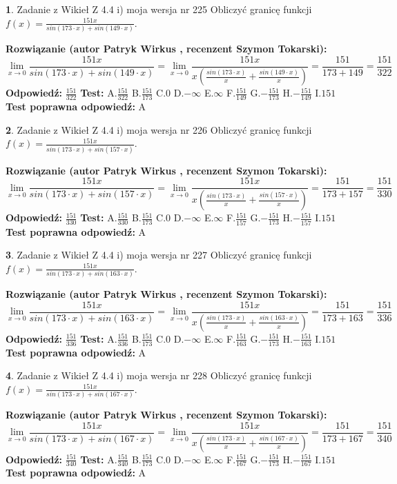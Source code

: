 \documentclass[12pt, a4paper]{article}
\theoremstyle{definition} %
\newtheorem{zad}{}
\newcommand{\zadStart}[1]{\begin{zad}#1\newline}
\newcommand{\zadStop}{\end{zad}}
\newcommand{\rozwStart}[2]{\noindent \textbf{Rozwiązanie (autor #1 , recenzent #2): }\newline}
\newcommand{\rozwStop}{\newline}
\newcommand{\odpStart}{\noindent \textbf{Odpowiedź:}\newline}
\newcommand{\odpStop}{\newline}
\newcommand{\testStart}{\noindent \textbf{Test:}\newline}
\newcommand{\testStop}{\newline}
\newcommand{\kluczStart}{\noindent \textbf{Test poprawna odpowiedź:}\newline}
\newcommand{\kluczStop}{\newline}
\begin{document}
\zadStart{Zadanie z Wikieł Z 4.4 i) moja wersja nr 225}
Obliczyć granicę funkcji $f(x)=\frac{151x}{sin(173\cdot x) +sin(149\cdot x)}$.
\zadStop
\rozwStart{Patryk Wirkus}{Szymon Tokarski}
$$\lim\limits_{x\to 0}\frac{151x}{sin(173\cdot x) +sin(149\cdot x)}=\lim\limits_{x\to 0}\frac{151x}{x(\frac{sin(173\cdot x)}{x}+\frac{sin(149\cdot x)}{x})}=\frac{151}{173+149} = \frac{151}{322}$$
\rozwStop
\odpStart
$\frac{151}{322}$
\odpStop
\testStart
A.$\frac{151}{322}$
B.$\frac{151}{173}$
C.$0$
D.$-\infty$
E.$\infty$
F.$\frac{151}{149}$
G.$-\frac{151}{173}$
H.$-\frac{151}{149}$
I.$151$
\testStop
\kluczStart
A
\kluczStop



\zadStart{Zadanie z Wikieł Z 4.4 i) moja wersja nr 226}
Obliczyć granicę funkcji $f(x)=\frac{151x}{sin(173\cdot x) +sin(157\cdot x)}$.
\zadStop
\rozwStart{Patryk Wirkus}{Szymon Tokarski}
$$\lim\limits_{x\to 0}\frac{151x}{sin(173\cdot x) +sin(157\cdot x)}=\lim\limits_{x\to 0}\frac{151x}{x(\frac{sin(173\cdot x)}{x}+\frac{sin(157\cdot x)}{x})}=\frac{151}{173+157} = \frac{151}{330}$$
\rozwStop
\odpStart
$\frac{151}{330}$
\odpStop
\testStart
A.$\frac{151}{330}$
B.$\frac{151}{173}$
C.$0$
D.$-\infty$
E.$\infty$
F.$\frac{151}{157}$
G.$-\frac{151}{173}$
H.$-\frac{151}{157}$
I.$151$
\testStop
\kluczStart
A
\kluczStop



\zadStart{Zadanie z Wikieł Z 4.4 i) moja wersja nr 227}
Obliczyć granicę funkcji $f(x)=\frac{151x}{sin(173\cdot x) +sin(163\cdot x)}$.
\zadStop
\rozwStart{Patryk Wirkus}{Szymon Tokarski}
$$\lim\limits_{x\to 0}\frac{151x}{sin(173\cdot x) +sin(163\cdot x)}=\lim\limits_{x\to 0}\frac{151x}{x(\frac{sin(173\cdot x)}{x}+\frac{sin(163\cdot x)}{x})}=\frac{151}{173+163} = \frac{151}{336}$$
\rozwStop
\odpStart
$\frac{151}{336}$
\odpStop
\testStart
A.$\frac{151}{336}$
B.$\frac{151}{173}$
C.$0$
D.$-\infty$
E.$\infty$
F.$\frac{151}{163}$
G.$-\frac{151}{173}$
H.$-\frac{151}{163}$
I.$151$
\testStop
\kluczStart
A
\kluczStop



\zadStart{Zadanie z Wikieł Z 4.4 i) moja wersja nr 228}
Obliczyć granicę funkcji $f(x)=\frac{151x}{sin(173\cdot x) +sin(167\cdot x)}$.
\zadStop
\rozwStart{Patryk Wirkus}{Szymon Tokarski}
$$\lim\limits_{x\to 0}\frac{151x}{sin(173\cdot x) +sin(167\cdot x)}=\lim\limits_{x\to 0}\frac{151x}{x(\frac{sin(173\cdot x)}{x}+\frac{sin(167\cdot x)}{x})}=\frac{151}{173+167} = \frac{151}{340}$$
\rozwStop
\odpStart
$\frac{151}{340}$
\odpStop
\testStart
A.$\frac{151}{340}$
B.$\frac{151}{173}$
C.$0$
D.$-\infty$
E.$\infty$
F.$\frac{151}{167}$
G.$-\frac{151}{173}$
H.$-\frac{151}{167}$
I.$151$
\testStop
\kluczStart
A
\kluczStop
\end{document}

